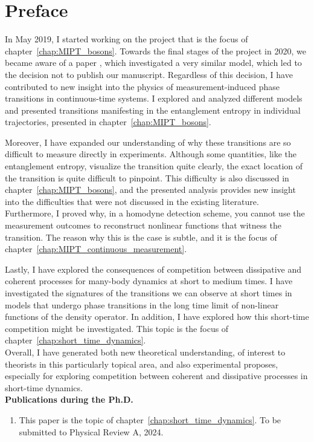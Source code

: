 
\chapter*{Preface}

In May 2019, I started working on the project that is the focus of chapter~\ref{chap:MIPT_bosons}. Towards the final stages of the project in 2020, we became aware of a paper \cite{fuji2020}, which investigated a very similar model, which led to the decision not to publish our manuscript. Regardless of this decision, I have contributed to new insight into the physics of measurement-induced phase transitions in continuous-time systems. I explored and analyzed different models and presented transitions manifesting in the entanglement entropy in individual trajectories, presented in chapter~\ref{chap:MIPT_bosons}.

Moreover, I have expanded our understanding of why these transitions are so difficult to measure directly in experiments. Although some quantities, like the entanglement entropy, visualize the transition quite clearly, the exact location of the transition is quite difficult to pinpoint. This difficulty is also discussed in chapter~\ref{chap:MIPT_bosons}, and the presented analysis provides new insight into the difficulties that were not discussed in the existing literature. Furthermore, I proved why, in a homodyne detection scheme, you cannot use the measurement outcomes to reconstruct nonlinear functions that witness the transition. The reason why this is the case is subtle, and it is the focus of chapter~\ref{chap:MIPT_continuous_measurement}.

Lastly, I have explored the consequences of competition between dissipative and coherent processes for many-body dynamics at short to medium times. I have investigated the signatures of the transitions we can observe at short times in models that undergo phase transitions in the long time limit of non-linear functions of the density operator. In addition, I have explored how this short-time competition might be investigated. This topic is the focus of chapter~\ref{chap:short_time_dynamics}. \\

Overall, I have generated both new theoretical understanding, of interest to theorists in this particularly topical area, and also experimental proposes, especially for exploring competition between coherent and dissipative processes in short-time dynamics. \\

\textbf{Publications during the Ph.D.}
\begin{enumerate}
    \item {}

    This paper is the topic of chapter~\ref{chap:short_time_dynamics}. To be submitted to Physical Review A, 2024.
\end{enumerate}

\cleardoublepage